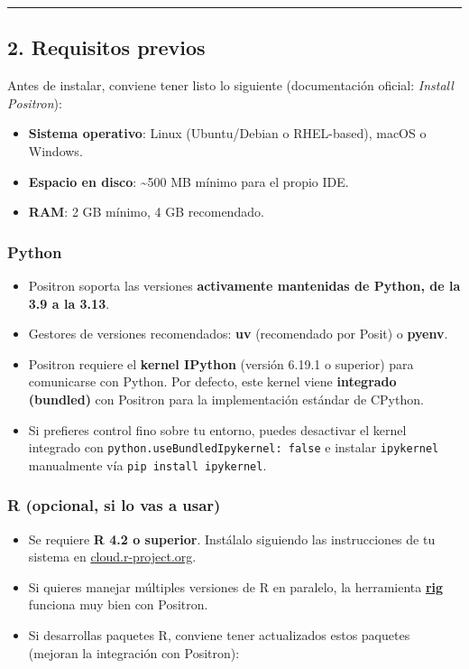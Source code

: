 \documentclass[
  doc,
  floatsintext,
  longtable,
  a4paper,
  nolmodern,
  notxfonts,
  notimes,
  12pt,
  colorlinks=true,linkcolor=blue,citecolor=blue,urlcolor=blue]{apa7}
\providecommand{\tightlist}{%
  \setlength{\itemsep}{0pt}\setlength{\parskip}{0pt}}
\begin{document}
\begin{center}\rule{0.5\linewidth}{0.5pt}\end{center}

\subsection{2. Requisitos previos}\label{requisitos-previos}

Antes de instalar, conviene tener listo lo siguiente (documentación
oficial: \emph{Install Positron}):

\begin{itemize}
\tightlist
\item
  \textbf{Sistema operativo}: Linux (Ubuntu/Debian o RHEL-based), macOS
  o Windows.
\item
  \textbf{Espacio en disco}: \textasciitilde500 MB mínimo para el propio
  IDE.
\item
  \textbf{RAM}: 2 GB mínimo, 4 GB recomendado.
\end{itemize}

\subsubsection{Python}\label{python}

\begin{itemize}
\tightlist
\item
  Positron soporta las versiones \textbf{activamente mantenidas de
  Python, de la 3.9 a la 3.13}.
\item
  Gestores de versiones recomendados: \textbf{uv} (recomendado por
  Posit) o \textbf{pyenv}.
\item
  Positron requiere el \textbf{kernel IPython} (versión 6.19.1 o
  superior) para comunicarse con Python. Por defecto, este kernel viene
  \textbf{integrado (bundled)} con Positron para la implementación
  estándar de CPython.
\item
  Si prefieres control fino sobre tu entorno, puedes desactivar el
  kernel integrado con \texttt{python.useBundledIpykernel:\ false} e
  instalar \texttt{ipykernel} manualmente vía
  \texttt{pip\ install\ ipykernel}.
\end{itemize}

\subsubsection{R (opcional, si lo vas a
usar)}\label{r-opcional-si-lo-vas-a-usar}

\begin{itemize}
\tightlist
\item
  Se requiere \textbf{R 4.2 o superior}. Instálalo siguiendo las
  instrucciones de tu sistema en
  \href{https://cloud.r-project.org/}{cloud.r-project.org}.
\item
  Si quieres manejar múltiples versiones de R en paralelo, la
  herramienta \textbf{\href{https://github.com/r-lib/rig}{rig}} funciona
  muy bien con Positron.
\item
  Si desarrollas paquetes R, conviene tener actualizados estos paquetes
  (mejoran la integración con Positron):
\end{itemize}
\end{document}
